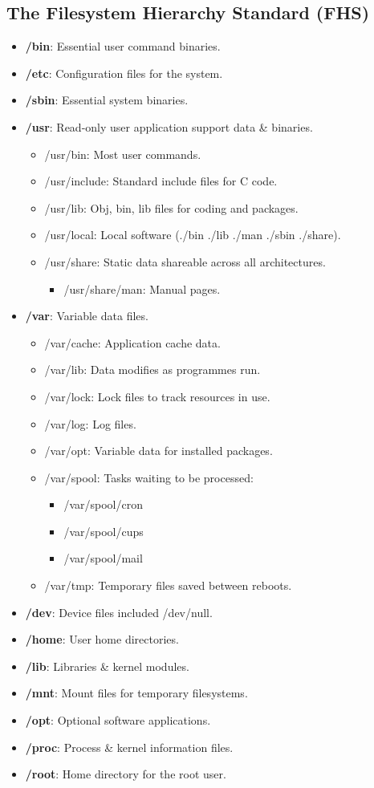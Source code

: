 \documentclass[11pt,a4paper]{article}
\begin{document}
\subsection{The Filesystem Hierarchy Standard (FHS)}
\begin{itemize}
\item \textbf{/bin}: Essential user command binaries.
\item \textbf{/etc}: Configuration files for the system.
\item \textbf{/sbin}: Essential system binaries.
\item \textbf{/usr}: Read-only user application support data \& binaries.
\begin{itemize}
\item /usr/bin: Most user commands.
\item /usr/include: Standard include files for C code.
\item /usr/lib: Obj, bin, lib files for coding and packages.
\item /usr/local: Local software (./bin ./lib ./man ./sbin ./share).
\item /usr/share: Static data shareable across all architectures.
\begin{itemize}
\item /usr/share/man: Manual pages.
\end{itemize}
\end{itemize}
\item \textbf{/var}: Variable data files.
\begin{itemize}
\item /var/cache: Application cache data.
\item /var/lib: Data modifies as programmes run.
\item /var/lock: Lock files to track resources in use.
\item /var/log: Log files.
\item /var/opt: Variable data for installed packages.
\item /var/spool: Tasks waiting to be processed:
\begin{itemize}
\item /var/spool/cron
\item /var/spool/cups
\item /var/spool/mail
\end{itemize}
\item /var/tmp: Temporary files saved between reboots.
\end{itemize}
\item \textbf{/dev}: Device files included /dev/null.
\item \textbf{/home}: User home directories.
\item \textbf{/lib}: Libraries \& kernel modules.
\item \textbf{/mnt}: Mount files for temporary filesystems.
\item \textbf{/opt}: Optional software applications.
\item \textbf{/proc}: Process \& kernel information files.
\item \textbf{/root}: Home directory for the root user.
\end{itemize}
\newpage
\end{document}
